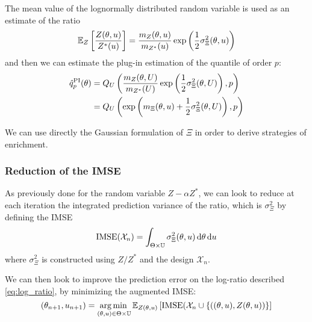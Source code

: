 \documentclass[../../Main_ManuscritThese.tex]{subfiles}
\begin{document}
The mean value of the lognormally distributed random variable is used as an estimate of the ratio
\begin{equation}
  \label{eq:mean_ratio_logn}
\mathbb{E}_Z\left[\frac{Z(\theta, u)}{Z^*(u)}\right] = \frac{m_Z(\theta, u)}{m_{Z^*}(u)}\exp\left(\frac{1}{2}\sigma^2_{\Xi}(\theta, u)\right) 
\end{equation}
and then we can estimate the plug-in estimation of the quantile of order $p$:
\begin{align}
  \hat{q}^{\mathrm{PI}}_p(\theta) &= Q_{U}\left(\frac{m_Z(\theta, U)}{m_{Z^*}(U)}\exp\left(\frac{1}{2}\sigma^2_{\Xi}(\theta, U)\right),p \right)\\ &= Q_{U}\left(\exp\left(m_{\Xi}(\theta, u)+\frac{1}{2}\sigma^2_{\Xi}(\theta, U)\right),p \right)
\end{align}


  We can use directly the Gaussian formulation of $\Xi$ in order to derive strategies of enrichment.
  
\subsubsection{Reduction of the IMSE}
As previously done for the random variable $Z - \alpha Z^*$, we can look to reduce at each iteration the integrated prediction variance of the ratio, which is $\sigma^2_{\Xi}$ by defining the IMSE
\begin{equation}
  \operatorname{\mathrm{IMSE}}(\mathcal{X}_n) = \int_{\Theta\times\mathbb{U}} \sigma_{\Xi}^2(\theta, u) \,\mathrm{d}\theta\,\mathrm{d}u
\end{equation}
where $\sigma_\Xi^2$ is constructed using $Z/Z^*$ and the design $\mathcal{X}_n$.

We can then look to improve the prediction error on the log-ratio described \cref{eq:log_ratio}, by minimizing the augmented IMSE:
\begin{equation}
  \label{eq:aIMSE_Xi}
 (\theta_{n+1}, u_{n+1}) = \operatorname*{arg\,min \,}_{(\theta, u) \in \Theta \times \mathbb{U}}\mathbb{E}_{Z(\theta,u)}\left[\operatorname{\mathrm{IMSE}}(\mathcal{X}_n \cup \left\{\left((\theta, u),Z(\theta, u)\right)\right\}\right]
\end{equation}
\end{document}
